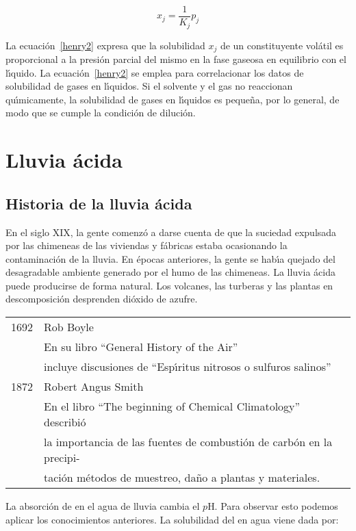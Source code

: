  \begin{equation}
x_j=\frac{1}{K_j}p_j
\label{henry2}
\end{equation}

La ecuaci\'on~\ref{henry2} expresa que la solubilidad $x_j$ de un constituyente vol\'atil es proporcional a la presi\'on parcial del mismo en la fase gaseosa en equilibrio con el l\'{\i}quido. La ecuaci\'on~\ref{henry2} se emplea para correlacionar los datos de solubilidad de gases en l\'{\i}quidos. Si el solvente y el gas no reaccionan qu\'{\i}micamente, la solubilidad de gases en l\'{\i}quidos es peque\~na, por lo general, de modo que se cumple la condici\'on de diluci\'on. 

\section{Lluvia \'acida}
\label{llacd}

\subsection{Historia de la lluvia \'acida}
\label{hllacd}
En el siglo XIX, la gente comenz\'o a darse cuenta de que la suciedad expulsada por las chimeneas de las viviendas y f\'abricas estaba ocasionando la contaminaci\'on de la lluvia. En \'epocas anteriores, la gente se hab\'{\i}a quejado del desagradable ambiente generado por el humo de las chimeneas. La lluvia \'acida puede producirse de forma natural. Los volcanes, las turberas y las plantas en descomposici\'on desprenden di\'oxido de azufre.

\begin{tabular}{cl}
1692 & Rob Boyle\\
     & En su libro ``General History of the Air''\\
     & incluye discusiones de ``Esp\'{\i}ritus nitrosos o sulfuros salinos''\\
1872 & Robert Angus Smith\\
     & En el libro ``The beginning of Chemical Climatology'' describi\'o \\
     & la importancia de las fuentes de combusti\'on de carb\'on en la precipi-\\
     & ta\-ci\-\'on m\'etodos de muestreo, da\~no a plantas y materiales.
\end{tabular}

La absorci\'on de  en el agua de lluvia cambia el $p$H.  Para observar esto podemos aplicar los conocimientos anteriores. La solubilidad del  en agua viene dada por:

